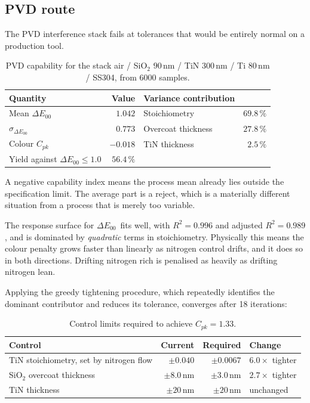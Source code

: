 \documentclass[11pt,a4paper]{article}
\newcommand{\dE}{\ensuremath{\Delta E_{00}}}
\newcommand{\Cpk}{\ensuremath{C_{pk}}}
\newcommand{\nm}{\ensuremath{\,\mathrm{nm}}}
\begin{document}
\subsection{PVD route}

The PVD interference stack fails at tolerances that would be entirely normal on
a production tool.

\begin{table}[htbp]
\centering
\begin{tabular}{@{}lrlr@{}}
\toprule
\textbf{Quantity} & \textbf{Value} & \textbf{Variance contribution} & \\
\midrule
Mean \dE                     & $1.042$    & Stoichiometry      & $69.8\,\%$ \\
$\sigma_{\dE}$               & $0.773$    & Overcoat thickness & $27.8\,\%$ \\
Colour \Cpk                  & $-0.018$   & TiN thickness      & $2.5\,\%$ \\
Yield against $\dE \le 1.0$  & $56.4\,\%$ &                    & \\
\bottomrule
\end{tabular}
\caption{PVD capability for the stack air / SiO$_2$ $90\nm$ / TiN $300\nm$ /
Ti $80\nm$ / SS304, from 6000 samples.}
\end{table}

A negative capability index means the process mean already lies outside the
specification limit. The average part is a reject, which is a materially
different situation from a process that is merely too variable.

The response surface for \dE\ fits well, with $R^2 = 0.996$ and adjusted
$R^2 = 0.989$, and is dominated by \emph{quadratic} terms in stoichiometry.
Physically this means the colour penalty grows faster than linearly as nitrogen
control drifts, and it does so in both directions. Drifting nitrogen rich is
penalised as heavily as drifting nitrogen lean.

Applying the greedy tightening procedure, which repeatedly identifies the
dominant contributor and reduces its tolerance, converges after 18 iterations:

\begin{table}[htbp]
\centering
\begin{tabular}{@{}lrrl@{}}
\toprule
\textbf{Control} & \textbf{Current} & \textbf{Required} & \textbf{Change} \\
\midrule
TiN stoichiometry, set by nitrogen flow & $\pm 0.040$  & $\pm 0.0067$ & $6.0\times$ tighter \\
SiO$_2$ overcoat thickness              & $\pm 8.0\nm$ & $\pm 3.0\nm$ & $2.7\times$ tighter \\
TiN thickness                           & $\pm 20\nm$  & $\pm 20\nm$  & unchanged \\
\bottomrule
\end{tabular}
\caption{Control limits required to achieve $\Cpk = 1.33$.}
\end{table}
\end{document}
